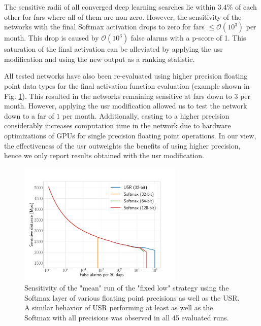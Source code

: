 The sensitive radii of all converged deep learning searches lie within $3.4\%$ of each other for \acrshort{far}s where all of them are non-zero. However, the sensitivity of the networks with the final Softmax activation drops to zero for \acrshort{far}s $\leq\mathcal{O}(10^3)$ per month. This drop is caused by $\mathcal{O}(10^3)$ false alarms with a p-score of 1. This saturation of the final activation can be alleviated by applying the \acrshort{usr} modification and using the new output as a ranking statistic.

All tested networks have also been re-evaluated using higher precision floating point data types for the final activation function evaluation (example shown in Fig. \ref{fig:precision_sensitivities}). This resulted in the networks remaining sensitive at \acrshort{far}s down to $3$ per month. However, applying the \acrshort{usr} modification allowed us to test the network down to a \acrshort{far} of $1$ per month. Additionally, casting to a higher precision considerably increases computation time in the network due to hardware optimizations of GPUs for single precision floating point operations. In our view, the effectiveness of the \acrshort{usr} outweights the benefits of using higher precision, hence we only report results obtained with the \acrshort{usr} modification.

\begin{figure}
    \centering
    \includegraphics[width=0.7\textwidth]{chapters/training_strats/images/precision_712.pdf}
    \caption[Sensitive distance of different floating point precisions]{Sensitivity of the "mean" run of the "fixed low" strategy using the Softmax layer of various floating point precisions as well as the USR. A similar behavior of USR performing at least as well as the Softmax with all precisions was observed in all 45 evaluated runs.}
    \label{fig:precision_sensitivities}
\end{figure}

